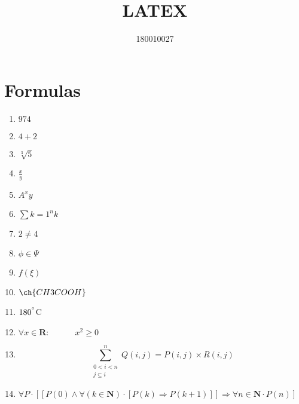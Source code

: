 \documentclass{article}
\title{LATEX}
\author{180010027}
\begin{document}
\maketitle{}
\section{Formulas}
	\begin{enumerate}[label=(\alph*)]
	\item$974$
	\item$4 + 2$
	\item$\sqrt[3]5$
	\item$\frac{x}{y}$
	\item$A^x y$
	\item$\sum k = 1^n k$
	\item$2 \neq 4$
	\item$\phi \in \Psi$
	\item$f (\xi)$
	\item$\ch{CH3COOH}$
	\item$180^{\degree}$C
	\item$\forall x \in \mathbf{R}: \quad\quad\quad x^2 \geq 0$
	\item
		\begin{equation*}
			\sum_{\substack{0 < i < n\\{j\subseteq i}}}^{n} Q(i,j) = P(i,j) \times R(i,j)
		\end{equation*}
	\item$\forall P \cdot [[P(0) \wedge \forall(k \in \mathbf{N}) \cdot [P(k)  \Longrightarrow P(k+1)]] \Longrightarrow \forall n \in \mathbf{N} \cdot P(n)]$
\end{enumerate}
\end{document}
